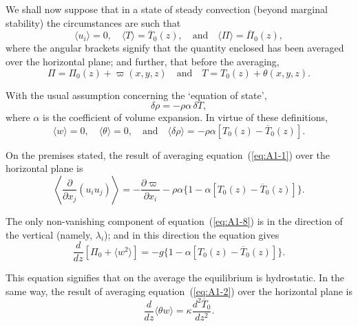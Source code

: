 We shall now suppose that in a state of steady convection (beyond marginal stability) the circumstances are such that
\begin{equation}
\label{eq:A1-4}
\langle u_i \rangle = 0, \quad \langle T \rangle = \overline{T}_0(z), \quad \text{and} \quad \langle \Pi \rangle = \overline{\Pi}_0(z),
\end{equation}
where the angular brackets signify that the quantity enclosed has been averaged over the horizontal plane; and further, that before the averaging,
\begin{equation}
\label{eq:A1-5}
\Pi = \Pi_0(z) + \varpi(x, y, z) \quad \text{and} \quad T = T_0(z) + \theta(x, y, z).
\end{equation}

With the usual assumption concerning the `equation of state',
\begin{equation}
\label{eq:A1-6}
\delta \rho = -\rho \alpha \, \delta T,
\end{equation}
where $\alpha$ is the coefficient of volume expansion. In virtue of these definitions,
\begin{equation}
\label{eq:A1-7}
\langle w \rangle = 0, \quad \langle \theta \rangle = 0, \quad \text{and} \quad \langle \delta \rho \rangle = -\rho \alpha [T_0(z) - \overline{T}_0(z)].
\end{equation}

On the premises stated, the result of averaging equation~(\ref{eq:A1-1}) over the horizontal plane is
\begin{equation}
\label{eq:A1-8}
\left\langle \frac{\partial}{\partial x_j}(u_i u_j) \right\rangle = -\frac{\partial \varpi}{\partial x_i} - \rho \alpha \{1 - \alpha [T_0(z) - \overline{T}_0(z)]\}.
\end{equation}

The only non-vanishing component of equation~(\ref{eq:A1-8}) is in the direction of the vertical (namely, $\lambda_i$); and in this direction the equation gives
\begin{equation}
\label{eq:A1-9}
\frac{d}{dz}[\Pi_0 + \langle w^2 \rangle] = -g\{1 - \alpha[T_0(z) - \overline{T}_0(z)]\}.
\end{equation}

This equation signifies that on the average the equilibrium is hydrostatic. In the same way, the result of averaging equation~(\ref{eq:A1-2}) over the horizontal plane is
\begin{equation}
\label{eq:A1-10}
\frac{d}{dz}\langle \theta w \rangle = \kappa \frac{d^2 \overline{T}_0}{dz^2}.
\end{equation}

